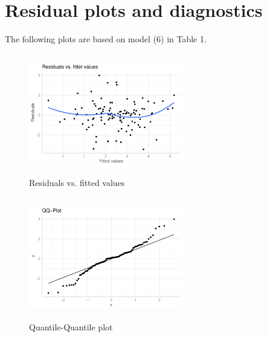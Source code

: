 \documentclass[abstract=on]{scrartcl}
\begin{document}
\begin{table}[H]
\begin{tiny}

\end{tiny}
\end{table} 

\newpage
\section{Residual plots and diagnostics}

The following plots are based on model (6) in Table 1.

\begin{figure}[H]
 \includegraphics[width=0.6\textwidth, height=200px]{A5-ResidualPlot.pdf}
 \caption{Residuals vs. fitted values}
\label{Figure 3}
\end{figure}

\begin{figure}[H]
 \includegraphics[width=0.6\textwidth, height=200px]{A6-QQPlot.pdf}
 \caption{Quantile-Quantile plot}
\label{Figure 3}
\end{figure}
\end{document}
